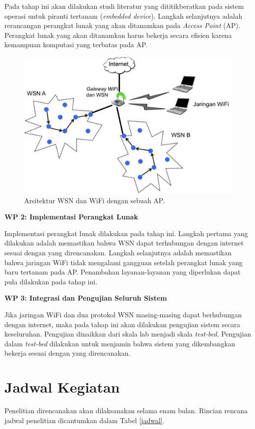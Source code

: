 	Pada tahap ini akan dilakukan studi literatur yang dititikberatkan pada sistem operasi untuk piranti tertanam (\emph{embedded device}). Langkah selanjutnya adalah rerancangan perangkat lunak yang akan ditanamkan pada \emph{Access Point} (AP). Perangkat lunak yang akan ditanamkan harus bekerja secara efisien karena kemampuan komputasi yang terbatas pada AP.

		\begin{figure}[ht!]
		  \centering
		    \includegraphics{gambar/wifi}
		    \caption{Arsitektur WSN dan WiFi dengan sebuah AP.}
		    \label{wifi}
		\end{figure}

	\noindent\textbf{WP 2: Implementasi Perangkat Lunak}

	Implementasi perangkat lunak dilakukan pada tahap ini. Langkah pertama yang dilakukan adalah memastikan bahwa WSN dapat terhubungan dengan internet sesuai dengan yang direncanakan. Langkah selanjutnya adalah memastikan bahwa jaringan WiFi tidak mengalami gangguan setelah perangkat lunak yang baru tertanam pada AP. Penambahan layanan-layanan yang diperlukan dapat pula dilakukan pada tahap ini.

	\noindent\textbf{WP 3: Integrasi dan Pengujian Seluruh Sistem}

	Jika jaringan WiFi dan dua protokol WSN masing-masing dapat berhubungan dengan internet, maka pada tahap ini akan dilakukan pengujian sistem secara keseluruhan. Pengujian dinaikkan dari skala lab menjadi skala \emph{test-bed}. Pengujian dalam \emph{test-bed} dilakukan untuk menjamin bahwa sistem yang dikembangkan bekerja sesuai dengan yang direncanakan.


\section{Jadwal Kegiatan}
	Penelitian direncanakan akan dilaksanakan selama enam bulan. Rincian rencana jadwal penelitian dicantumkan dalam Tabel \ref{jadwal}.

